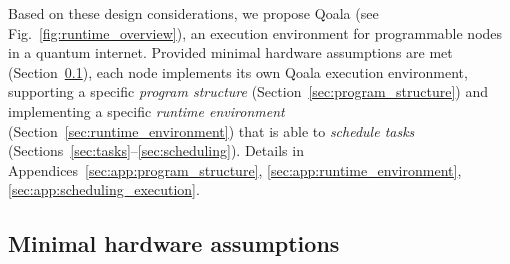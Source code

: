 

Based on these design considerations, we propose Qoala (see Fig.~\ref{fig:runtime_overview}), an execution environment for programmable nodes in a quantum internet. 
Provided minimal hardware assumptions are met (Section~\ref{sec:minimal_hardware_assumptions}), 
each node implements its own Qoala execution environment, supporting a specific \textit{program structure} (Section~\ref{sec:program_structure})
and implementing a specific \textit{runtime environment} (Section~\ref{sec:runtime_environment}) that is able to \textit{schedule tasks} (Sections~\ref{sec:tasks}--\ref{sec:scheduling}).
Details in Appendices~\ref{sec:app:program_structure}, \ref{sec:app:runtime_environment}, \ref{sec:app:scheduling_execution}.

\subsection{Minimal hardware assumptions}
\label{sec:minimal_hardware_assumptions}

